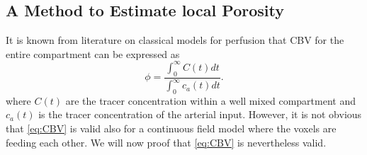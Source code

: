 \documentclass[paper=a4, fontsize=11pt,parskip=half,headings=small]{scrartcl}
\begin{document}
	
	


	\subsection{A Method to Estimate local Porosity}\label{sec:CBV}
	
	It is known from literature on classical models for perfusion that CBV for the entire compartment can be expressed as
	\begin{equation}
		\phi = \frac{\int_0^\infty C(t) dt}{\int_0^\infty c_a(t) dt}.
		\label{eq:CBV}
	\end{equation}
	where $C(t)$ are the tracer concentration within a well mixed compartment and $c_a(t)$ is the tracer concentration of the arterial input.
	However, it is not obvious that \eqref{eq:CBV} is valid also for a continuous field model where the voxels are feeding each other. We will now proof that \eqref{eq:CBV} is nevertheless valid.
	
\end{document}
